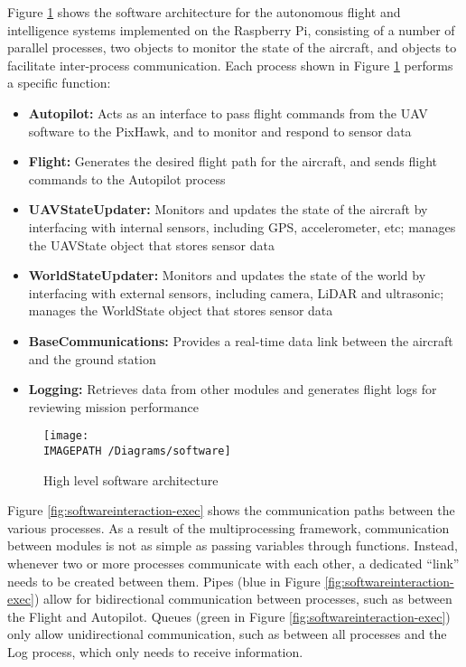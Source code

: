 Figure \ref{fig:softwarearchitecture-exec} shows the software architecture for the autonomous flight and intelligence systems implemented on the Raspberry Pi, consisting of a number of parallel processes, two objects to monitor the state of the aircraft, and objects to facilitate inter-process communication. Each process shown in Figure \ref{fig:softwarearchitecture-exec} performs a specific function:
\begin{itemize}
	\item \textbf{Autopilot:} Acts as an interface to pass flight commands from the UAV software to the PixHawk, and to monitor and respond to sensor data
	\item \textbf{Flight:} Generates the desired flight path for the aircraft, and sends flight commands to the Autopilot process
	\item \textbf{UAVStateUpdater:} Monitors and updates the state of the aircraft by interfacing with internal sensors, including GPS, accelerometer, etc; manages the UAVState object that stores sensor data
	\item \textbf{WorldStateUpdater:} Monitors and updates the state of the world by interfacing with external sensors, including camera, LiDAR and ultrasonic; manages the WorldState object that stores sensor data
	\item \textbf{BaseCommunications:} Provides a real-time data link between the aircraft and the ground station
	\item \textbf{Logging:} Retrieves data from other modules and generates flight logs for reviewing mission performance
\end{itemize}

\begin{figure}[!ht]
	\centering
	\texttt{[image: \\IMAGEPATH /Diagrams/software]}
	\caption{High level software architecture}
	\label{fig:softwarearchitecture-exec}
\end{figure}

Figure \ref{fig:softwareinteraction-exec} shows the communication paths between the various processes. As a result of the multiprocessing framework, communication between modules is not as simple as passing variables through functions. Instead, whenever two or more processes communicate with each other, a dedicated ``link'' needs to be created between them. Pipes (blue in Figure \ref{fig:softwareinteraction-exec}) allow for bidirectional communication between processes, such as between the Flight and Autopilot. Queues (green in Figure \ref{fig:softwareinteraction-exec}) only allow unidirectional communication, such as between all processes and the Log process, which only needs to receive information.\\

